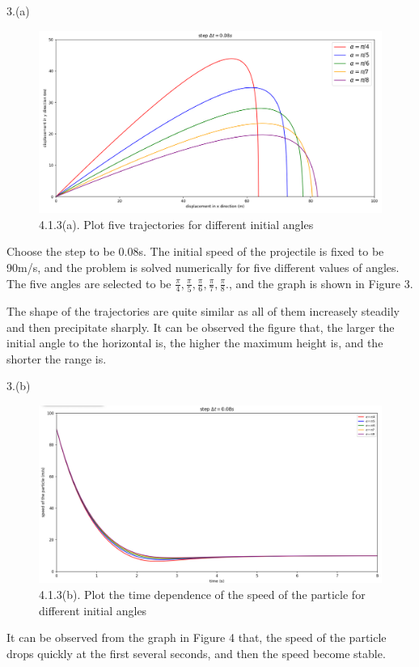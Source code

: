 \documentclass{book}
\begin{document}
{\Large 3.(a)}
\begin{figure}[H]
  \centering
  \includegraphics[scale=0.4]{./graphs/project4.1.3(a).png}
  \caption{4.1.3(a). Plot five trajectories for different initial angles}
\end{figure}
Choose the step to be 0.08s.
The initial speed of the projectile is fixed to be 90m/s, and the problem is solved numerically for five different values of angles.
  {The five angles are selected to be $\frac{\pi}{4},\frac{\pi}{5},\frac{\pi}{6},\frac{\pi}{7},\frac{\pi}{8}.$}, and the graph is shown in Figure 3.

The shape of the trajectories are quite similar as all of them increasely steadily and then precipitate sharply.
It can be observed the figure that, the larger the initial angle to the horizontal is, the higher the maximum height is, and the shorter the range is.

\newpage
{\Large 3.(b)}
\begin{figure}[H]
  \centering
  \includegraphics[scale=0.4]{./graphs/project4.1.3(b).png}
  \caption{4.1.3(b). Plot the time dependence of the speed of the particle for different initial angles}
\end{figure}
It can be observed from the graph in Figure 4 that, the speed of the particle drops quickly at the first several seconds, and then the speed become stable.
\end{document}
